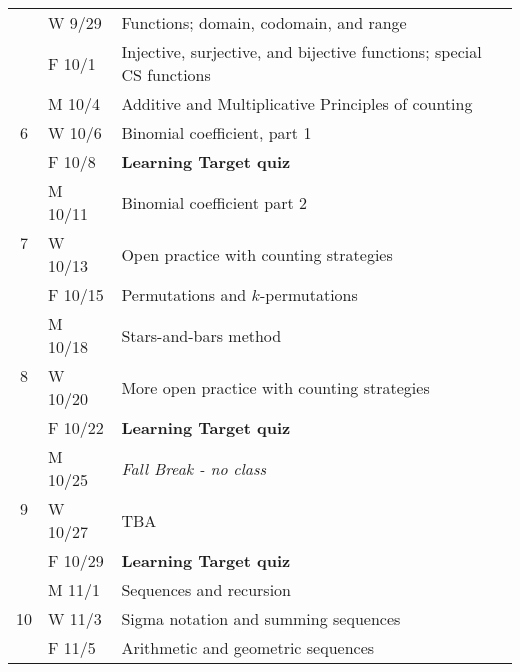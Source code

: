 \documentclass[]{article}
\begin{document}
\begin{table}[H]
\begin{tabular}{|c|l|l|}
                    & W 9/29  & Functions; domain, codomain, and range                               \\ \cline{2-3} 
                    & F 10/1  & Injective, surjective, and bijective functions; special CS functions \\ \hline
\multirow{3}{*}{6}  & M 10/4  & Additive and Multiplicative Principles of counting                   \\ \cline{2-3} 
                    & W 10/6  & Binomial coefficient, part 1                                         \\ \cline{2-3} 
                    & F 10/8  & \textbf{Learning Target quiz}                                        \\ \hline
\multirow{3}{*}{7}  & M 10/11 & Binomial coefficient part 2                                          \\ \cline{2-3} 
                    & W 10/13 & Open practice with counting strategies                               \\ \cline{2-3} 
                    & F 10/15 & Permutations and $k$-permutations                                    \\ \hline
\multirow{3}{*}{8}  & M 10/18 & Stars-and-bars method                                                \\ \cline{2-3} 
                    & W 10/20 & More open practice with counting strategies                          \\ \cline{2-3} 
                    & F 10/22 & \textbf{Learning Target quiz}                                        \\ \hline
\multirow{3}{*}{9}  & M 10/25 & \textit{Fall Break - no class}                                       \\ \cline{2-3} 
                    & W 10/27 & TBA                                                                  \\ \cline{2-3} 
                    & F 10/29 & \textbf{Learning Target quiz}                                        \\ \hline
\multirow{3}{*}{10} & M 11/1  & Sequences and recursion                                              \\ \cline{2-3} 
                    & W 11/3  & Sigma notation and summing sequences                                 \\ \cline{2-3} 
                    & F 11/5  & Arithmetic and geometric sequences                                   \\ \hline

\end{tabular}
\end{table}
\end{document}
